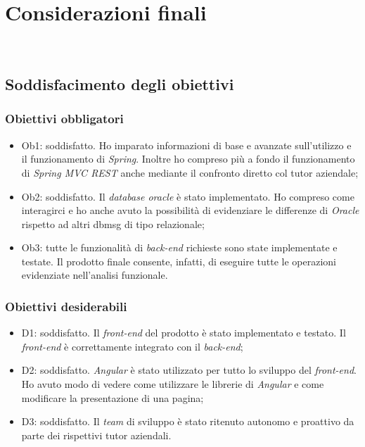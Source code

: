 
\chapter{Considerazioni finali}
\label{cap:considerazioni}

\\

\section{Soddisfacimento degli obiettivi}
\subsection{Obiettivi obbligatori}
\begin{itemize}
    \item Ob1: soddisfatto. Ho imparato informazioni di base e avanzate sull'utilizzo e il funzionamento di \textit{Spring}. Inoltre ho compreso più a fondo il funzionamento di \textit{Spring MVC REST} anche mediante il confronto diretto col tutor aziendale;
    \item Ob2: soddisfatto. Il \textit{database oracle} è stato implementato. Ho compreso come interagirci e ho anche avuto la possibilità di evidenziare le differenze di \textit{Oracle} rispetto ad altri \gls{dbmsg} di tipo relazionale;
    \item Ob3: tutte le funzionalità di \textit{back-end} richieste sono state implementate e testate. Il prodotto finale consente, infatti, di eseguire tutte le operazioni evidenziate nell'analisi funzionale.
\end{itemize}
\subsection{Obiettivi desiderabili}
\begin{itemize}
    \item D1: soddisfatto. Il \textit{front-end} del prodotto è stato implementato e testato. Il \textit{front-end} è correttamente integrato con il \textit{back-end};
    \item D2: soddisfatto. \textit{Angular} è stato utilizzato per tutto lo sviluppo del \textit{front-end}. Ho avuto modo di vedere come utilizzare le librerie di \textit{Angular} e come modificare la presentazione di una pagina;
    \item D3: soddisfatto. Il \textit{team} di sviluppo è stato ritenuto autonomo e proattivo da parte dei rispettivi tutor aziendali.
\end{itemize}
